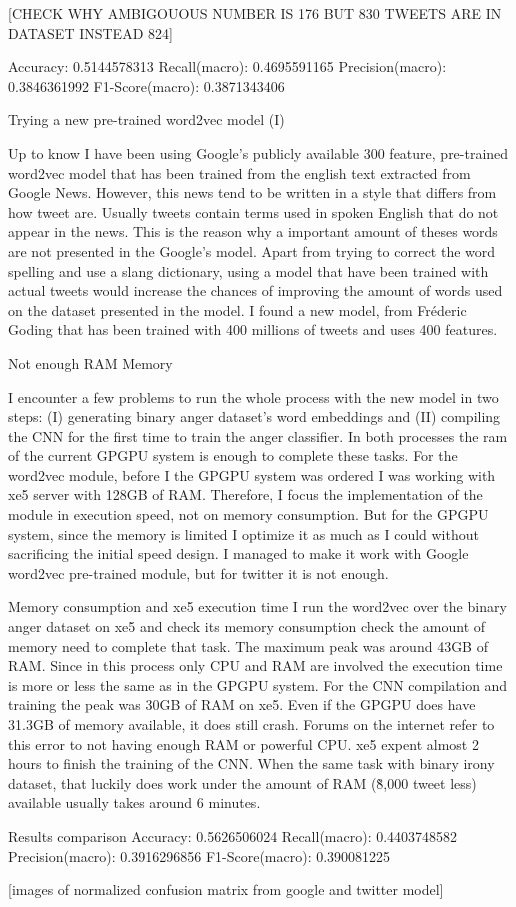 [CHECK WHY AMBIGOUOUS NUMBER IS 176 BUT 830 TWEETS ARE IN DATASET INSTEAD 824]

Accuracy: 0.5144578313
Recall(macro): 0.4695591165
Precision(macro): 0.3846361992
F1-Score(macro): 0.3871343406

Trying a new pre-trained word2vec model (I)

Up to know I have been using Google’s publicly available 300 feature, pre-trained word2vec model that has been trained from the english text extracted from Google News.
However, this news tend to be written in a style that differs from how tweet are. Usually tweets contain terms used in spoken English that do not appear in the news. This is the reason why a important amount of theses words are not presented in the Google’s model. Apart from trying to correct the word spelling and use a slang dictionary, using a model that have been trained with actual tweets would increase the chances of improving the amount of words used on the dataset presented in the model.
I found a new model, from Fréderic Goding\cite{godin2015multimedi} that has been trained with 400 millions of tweets and uses 400 features.

Not enough RAM Memory

I encounter a few problems to run the whole process with the new model in two steps: (I) generating binary anger dataset’s word embeddings and (II) compiling the CNN for the first time to train the anger classifier. In both processes the ram of the current GPGPU system is enough to complete these tasks. 
For the word2vec module, before I the GPGPU system was ordered I was working with xe5 server with 128GB of RAM. Therefore, I focus the implementation of the module in execution speed, not on memory consumption. But for the GPGPU system, since the memory is limited I optimize it as much as I could without sacrificing the initial speed design. I managed to make it work with Google word2vec pre-trained module, but for twitter it is not enough.

Memory consumption and xe5 execution time
I run the word2vec over the binary anger dataset on xe5 and check its memory consumption check the amount of memory need to complete that task. The maximum peak was around 43GB of RAM. Since in this process only CPU and RAM are involved the execution time is more or less the same as in the GPGPU system.
For the CNN compilation and training the peak was 30GB of RAM on xe5. Even if the GPGPU does have 31.3GB of memory available, it does still crash. Forums on the internet refer to this error to not having enough RAM or powerful CPU. xe5 expent almost 2 hours to finish the training of the CNN. When the same task with binary irony dataset, that luckily does work under the amount of RAM (\~8,000 tweet less) available usually takes around 6 minutes.

Results comparison
Accuracy: 0.5626506024
Recall(macro): 0.4403748582
Precision(macro): 0.3916296856
F1-Score(macro): 0.390081225

[images of normalized confusion matrix from google and twitter model]